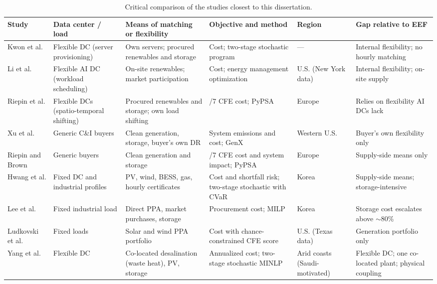 \begin{table}[!htbp]
\centering
\caption{Critical comparison of the studies closest to this dissertation.}
\label{tab:2.2}
\scriptsize
\renewcommand{\arraystretch}{1.2}
\begin{tabularx}{\textwidth}{>{\raggedright\arraybackslash}p{2.1cm}>{\raggedright\arraybackslash}p{2.3cm}>{\raggedright\arraybackslash}X>{\raggedright\arraybackslash}p{2.6cm}>{\raggedright\arraybackslash}p{1.6cm}>{\raggedright\arraybackslash}p{2.6cm}}
\toprule
\textbf{Study} & \textbf{Data center / load} & \textbf{Means of matching or flexibility} & \textbf{Objective and method} & \textbf{Region} & \textbf{Gap relative to EEF} \\
\midrule
Kwon et al. \cite{r5} & Flexible DC (server provisioning) & Own servers; procured renewables and storage & Cost; two-stage stochastic program & --- & Internal flexibility; no hourly matching \\
Li et al. \cite{r8} & Flexible AI DC (workload scheduling) & On-site renewables; market participation & Cost; energy management optimization & U.S. (New York data) & Internal flexibility; on-site supply \\
Riepin et al. \cite{r9} & Flexible DCs (spatio-temporal shifting) & Procured renewables and storage; own load shifting & 24/7 CFE cost; PyPSA & Europe & Relies on flexibility AI DCs lack \\
Xu et al. \cite{r10} & Generic C\&I buyers & Clean generation, storage, buyer's own DR & System emissions and cost; GenX & Western U.S. & Buyer's own flexibility only \\
Riepin and Brown \cite{r11} & Generic buyers & Clean generation and storage & 24/7 CFE cost and system impact; PyPSA & Europe & Supply-side means only \\
Hwang et al. \cite{r14} & Fixed DC and industrial profiles & PV, wind, BESS, gas, hourly certificates & Cost and shortfall risk; two-stage stochastic with CVaR & Korea & Supply-side means; storage-intensive \\
Lee et al. \cite{r15} & Fixed industrial load & Direct PPA, market purchases, storage & Procurement cost; MILP & Korea & Storage cost escalates above $\sim$80\% \\
Ludkovski et al. \cite{r16} & Fixed loads & Solar and wind PPA portfolio & Cost with chance-constrained CFE score & U.S. (Texas data) & Generation portfolio only \\
Yang et al. \cite{r22} & Flexible DC & Co-located desalination (waste heat), PV, storage & Annualized cost; two-stage stochastic MINLP & Arid coasts (Saudi-motivated) & Flexible DC; one co-located plant; physical coupling \\

\end{tabularx}
\end{table}

